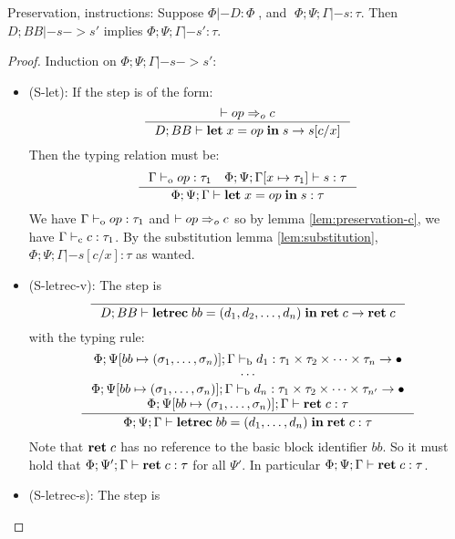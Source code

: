 \documentclass[a4paper, oneside, 10pt, draft]{memoir}
\begin{document}
\begin{lem}{Preservation, instructions:}
  \label{lem:preservation-i}
  Suppose $\Phi |- D : \Phi \;$, and $\; \Phi;\Psi;\Gamma |- s : \tau$. Then
  $D;BB |- s -> s'$ implies $\Phi;\Psi;\Gamma |- s' : \tau$.
\end{lem}
\begin{proof}
  Induction on $\Phi;\Psi;\Gamma |- s -> s'$:
  \begin{itemize}
  \item (S-let): If the step is of the form:
    \begin{equation*}
      \inference{|- op \eop c}{D;BB |- \ilet{x}{op}{s} -> s[c/x]}
    \end{equation*}
    Then the typing relation must be:
    \begin{equation*}
    \inference{\Gamma \tpop op : \tau_1 \quad \Phi ; \Psi ;
      \Gamma[x \mapsto \tau_1] |- s : \tau}{\Phi ; \Psi ; \Gamma |-
      \ilet{x}{op}{s} : \tau}
    \end{equation*}
    We have $\Gamma |-_{\mathrm{o}} op : \tau_1$ and $|- op =>_{o} c$ so by lemma
    \eqref{lem:preservation-c}, we have $\Gamma |-_{\mathrm{c}} c : \tau_1$. By the
    substitution lemma \eqref{lem:substitution}, $\Phi;\Psi;\Gamma |-
    s[c/x] : \tau$ as wanted.
  \item (S-letrec-v):
    The step is
    \begin{equation*}
      \inference{}{D;BB |- \iletrec{bb}{\dbundle}
        {\iret{c}} -> \iret{c}}
    \end{equation*}
    with the typing rule:
    \begin{equation*}
    \inference{\Phi;\Psi[bb \mapsto \bbtypes];\Gamma \tpb
      d_1 : \ntypes -> \bullet\\
      \dotsb\\
      \Phi;\Psi[bb \mapsto \bbtypes];\Gamma \tpb d_n : \ntypespp -> \bullet\\
      \Phi;\Psi[bb \mapsto \bbtypes];\Gamma |- \iret{c} : \tau}
       {\Phi;\Psi;\Gamma |- \iletrec{bb}{(d_1,
        \dotsc, d_n)}{\iret{c}} : \tau}\\\\
    \end{equation*}
    Note that $\mathbf{ret} \; c$ has no reference to the basic block
    identifier $bb$. So it must hold that $\Phi;\Psi';\Gamma |-
    \mathbf{ret} \; c : \tau$ for all $\Psi'$. In particular $\Phi;\Psi;\Gamma
    |- \mathbf{ret} \; c : \tau$.
  \item (S-letrec-s):
    The step is

\end{itemize}
\end{proof}
\end{document}
